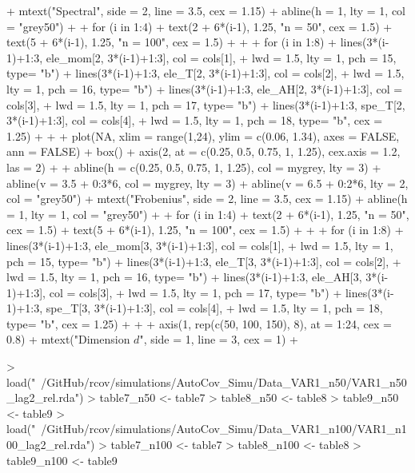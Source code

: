 \documentclass{article}
\begin{document}
\begin{Schunk}
\begin{Sinput}
{+   mtext("Spectral", side = 2, line = 3.5, cex = 1.15)
+   abline(h = 1, lty = 1, col = "grey50")
+ 
+   for (i in 1:4){
+     text(2 + 6*(i-1), 1.25, "n = 50", cex = 1.5)
+     text(5 + 6*(i-1), 1.25, "n = 100", cex = 1.5)
+   }
+ 
+   for (i in 1:8){
+     lines(3*(i-1)+1:3, ele_mom[2, 3*(i-1)+1:3], col = cols[1],
+           lwd = 1.5, lty = 1, pch = 15, type= "b")
+     lines(3*(i-1)+1:3, ele_T[2, 3*(i-1)+1:3], col = cols[2],
+           lwd = 1.5, lty = 1, pch = 16, type= "b")
+     lines(3*(i-1)+1:3, ele_AH[2, 3*(i-1)+1:3], col = cols[3],
+           lwd = 1.5, lty = 1, pch = 17, type= "b")
+     lines(3*(i-1)+1:3, spe_T[2, 3*(i-1)+1:3], col = cols[4],
+           lwd = 1.5, lty = 1, pch = 18, type= "b", cex = 1.25)
+   }
+ 
+   plot(NA, xlim = range(1,24), ylim = c(0.06, 1.34), axes = FALSE, ann = FALSE)
+   box()
+   axis(2, at = c(0.25, 0.5, 0.75, 1, 1.25), cex.axis = 1.2, las = 2)
+ 
+   abline(h = c(0.25, 0.5, 0.75, 1, 1.25), col = mygrey, lty = 3)
+   abline(v = 3.5 + 0:3*6, col = mygrey, lty = 3)
+   abline(v = 6.5 + 0:2*6, lty = 2, col = "grey50")
+   mtext("Frobenius", side = 2, line = 3.5, cex = 1.15)
+   abline(h = 1, lty = 1, col = "grey50")
+ 
+   for (i in 1:4){
+     text(2 + 6*(i-1), 1.25, "n = 50", cex = 1.5)
+     text(5 + 6*(i-1), 1.25, "n = 100", cex = 1.5)
+   }
+ 
+   for (i in 1:8){
+     lines(3*(i-1)+1:3, ele_mom[3, 3*(i-1)+1:3], col = cols[1],
+           lwd = 1.5, lty = 1, pch = 15, type= "b")
+     lines(3*(i-1)+1:3, ele_T[3, 3*(i-1)+1:3], col = cols[2],
+           lwd = 1.5, lty = 1, pch = 16, type= "b")
+     lines(3*(i-1)+1:3, ele_AH[3, 3*(i-1)+1:3], col = cols[3],
+           lwd = 1.5, lty = 1, pch = 17, type= "b")
+     lines(3*(i-1)+1:3, spe_T[3, 3*(i-1)+1:3], col = cols[4],
+           lwd = 1.5, lty = 1, pch = 18, type= "b", cex = 1.25)
+   }
+ 
+   axis(1, rep(c(50, 100, 150), 8), at = 1:24, cex = 0.8)
+   mtext("Dimension $d$", side = 1, line = 3, cex = 1)
+ }
\end{Sinput}
\end{Schunk}

\begin{Schunk}
\begin{Sinput}
> load("~/GitHub/rcov/simulations/AutoCov_Simu/Data_VAR1_n50/VAR1_n50_lag2_rel.rda")
> table7_n50 <- table7
> table8_n50 <- table8
> table9_n50 <- table9
> load("~/GitHub/rcov/simulations/AutoCov_Simu/Data_VAR1_n100/VAR1_n100_lag2_rel.rda")
> table7_n100 <- table7
> table8_n100 <- table8
> table9_n100 <- table9
\end{Sinput}
\end{Schunk}
\end{document}
